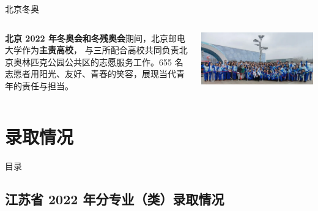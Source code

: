 \documentclass[aspectratio=169, utf8]{beamer}
\begin{document}
\begin{frame}{北京冬奥}
    \begin{columns}
        \setlength{\parindent}{2em}

        \textcolor{Fore}{\textbf{北京 2022 年冬奥会和冬残奥会}}期间，北京邮电大学作为\textcolor{Fore}{\textbf{主责高校}}，
        与三所配合高校共同负责北京奥林匹克公园公共区的志愿服务工作。655 名志愿者用阳光、友好、青春的笑容，展现当代青年的责任与担当。

        \includegraphics[width=\textwidth]{./resources/29.png}
    \end{columns}
\end{frame}

\section{录取情况}

\begin{frame}{目录}
    \begin{multicols}{2}
        \tableofcontents[currentsection]
    \end{multicols}
\end{frame}

\subsection*{江苏省 2022 年分专业（类）录取情况}
\end{document}
